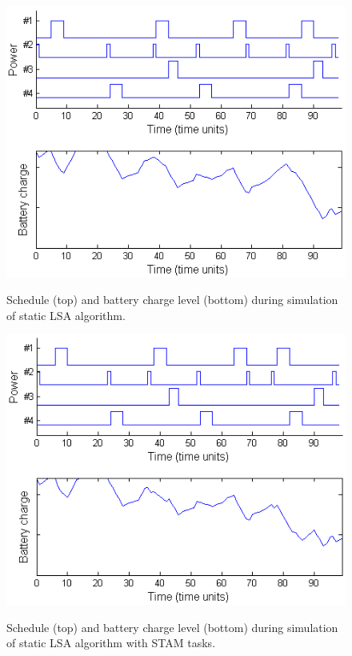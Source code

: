 \begin{figure}[tb]
\begin{center}
\includegraphics[scale=0.57]{lsabattery.png}
\label{fig:lsabattery}
\caption{Schedule (top) and battery charge level (bottom) during simulation of static LSA algorithm.}
\end{center}
\end{figure}

\begin{figure}[tb]
\begin{center}
\includegraphics[scale=0.57]{lsastambattery.png}
\label{fig:lsastambattery}
\caption{Schedule (top) and battery charge level (bottom) during simulation of static LSA algorithm with STAM tasks.}
\end{center}
\end{figure}

